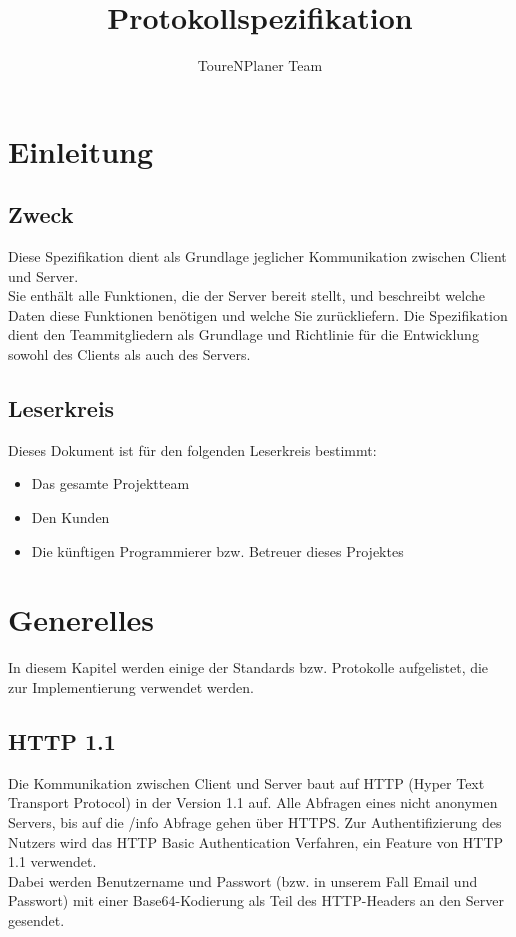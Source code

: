 \documentclass[ngerman,titlepage,parskip=true]{scrartcl}
\title{Protokollspezifikation}
\author{ToureNPlaner Team}
\begin{document}
\maketitle

\tableofcontents

\pagebreak

\section{Einleitung}

	\subsection{Zweck}
	
	Diese Spezifikation dient als Grundlage jeglicher Kommunikation zwischen Client und Server.\\
	Sie enthält alle Funktionen, die der Server bereit stellt, und beschreibt welche Daten diese Funktionen benötigen und welche Sie zurückliefern. 
	Die Spezifikation dient den Teammitgliedern als Grundlage und Richtlinie für die Entwicklung sowohl des Clients als auch des Servers.
	
	\subsection{Leserkreis}
	
	Dieses Dokument ist für den folgenden Leserkreis bestimmt:
	
	\begin{itemize}
		\item Das gesamte Projektteam
		\item Den Kunden
		\item Die künftigen Programmierer bzw. Betreuer dieses Projektes
	\end{itemize}
	
\section{Generelles}

	In diesem Kapitel werden einige der Standards bzw. Protokolle aufgelistet, die zur Implementierung verwendet werden.

	\subsection{HTTP 1.1}

	Die Kommunikation zwischen Client und Server baut auf HTTP (Hyper Text Transport Protocol) in der Version 1.1 auf. Alle Abfragen eines nicht anonymen Servers, bis auf die /info Abfrage gehen über HTTPS.
	Zur Authentifizierung des Nutzers wird das HTTP Basic Authentication Verfahren, ein Feature von HTTP 1.1 verwendet.\\
	Dabei werden Benutzername und Passwort (bzw. in unserem Fall Email und Passwort) mit einer Base64-Kodierung als Teil des HTTP-Headers an den Server gesendet.
	
\end{document}
